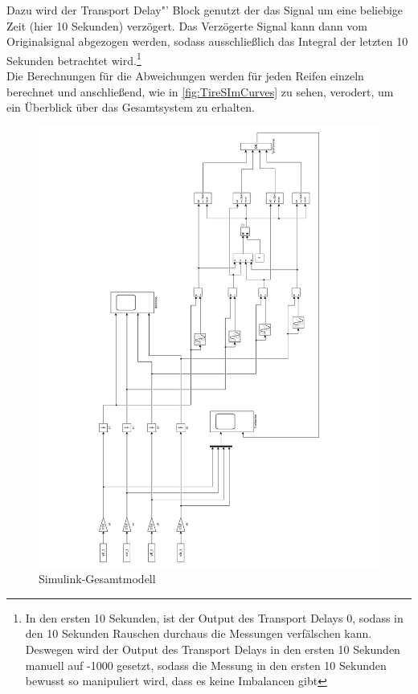 Dazu wird der  \glqq Transport Delay"' Block genutzt der das Signal um eine beliebige Zeit (hier 10 Sekunden) verzögert. Das Verzögerte Signal kann dann vom Originalsignal abgezogen werden, sodass ausschließlich das Integral der letzten 10 Sekunden betrachtet wird.\footnote{In den ersten 10 Sekunden, ist der Output des Transport Delays 0, sodass in den 10 Sekunden Rauschen durchaus die Messungen verfälschen kann. Deswegen wird der Output des Transport Delays in den ersten 10 Sekunden manuell auf -1000 gesetzt, sodass die Messung in den ersten 10 Sekunden bewusst so manipuliert wird, dass es keine Imbalancen gibt }\\
Die Berechnungen für die Abweichungen werden für jeden Reifen einzeln berechnet und anschließend, wie in \autoref{fig:TireSImCurves} zu sehen, verodert, um ein Überblick über das Gesamtsystem zu erhalten.\\


\begin{figure}[H]
	\centering
	\includegraphics[height=0.95\textheight]{../Graphiken/TireSimCurvesLandscape.pdf}
	\caption{Simulink-Gesamtmodell}
	\label{fig:TireSImCurves}
\end{figure}


